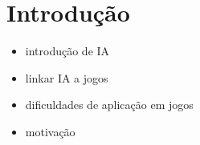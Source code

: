 \chapter{\label{chap:intro}Introdução}


\begin{itemize}
\item introdução de IA
\item linkar IA a jogos
\item dificuldades de aplicação em jogos
\item motivação 
\end{itemize}
